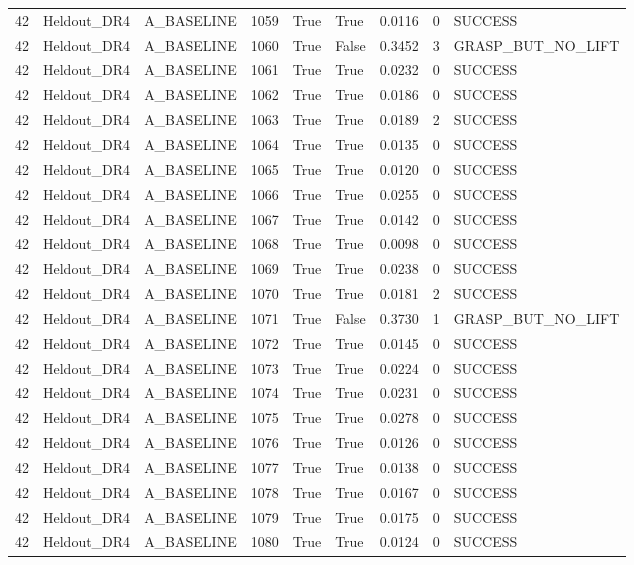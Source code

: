 \documentclass[11pt,a4paper,oneside]{book}
\begin{document}
\begin{longtable}{l l l l l l l l l}
42 & Heldout\_DR4 & A\_BASELINE & 1059 & True & True & 0.0116 & 0 & SUCCESS \\
42 & Heldout\_DR4 & A\_BASELINE & 1060 & True & False & 0.3452 & 3 & GRASP\_BUT\_NO\_LIFT \\
42 & Heldout\_DR4 & A\_BASELINE & 1061 & True & True & 0.0232 & 0 & SUCCESS \\
42 & Heldout\_DR4 & A\_BASELINE & 1062 & True & True & 0.0186 & 0 & SUCCESS \\
42 & Heldout\_DR4 & A\_BASELINE & 1063 & True & True & 0.0189 & 2 & SUCCESS \\
42 & Heldout\_DR4 & A\_BASELINE & 1064 & True & True & 0.0135 & 0 & SUCCESS \\
42 & Heldout\_DR4 & A\_BASELINE & 1065 & True & True & 0.0120 & 0 & SUCCESS \\
42 & Heldout\_DR4 & A\_BASELINE & 1066 & True & True & 0.0255 & 0 & SUCCESS \\
42 & Heldout\_DR4 & A\_BASELINE & 1067 & True & True & 0.0142 & 0 & SUCCESS \\
42 & Heldout\_DR4 & A\_BASELINE & 1068 & True & True & 0.0098 & 0 & SUCCESS \\
42 & Heldout\_DR4 & A\_BASELINE & 1069 & True & True & 0.0238 & 0 & SUCCESS \\
42 & Heldout\_DR4 & A\_BASELINE & 1070 & True & True & 0.0181 & 2 & SUCCESS \\
42 & Heldout\_DR4 & A\_BASELINE & 1071 & True & False & 0.3730 & 1 & GRASP\_BUT\_NO\_LIFT \\
42 & Heldout\_DR4 & A\_BASELINE & 1072 & True & True & 0.0145 & 0 & SUCCESS \\
42 & Heldout\_DR4 & A\_BASELINE & 1073 & True & True & 0.0224 & 0 & SUCCESS \\
42 & Heldout\_DR4 & A\_BASELINE & 1074 & True & True & 0.0231 & 0 & SUCCESS \\
42 & Heldout\_DR4 & A\_BASELINE & 1075 & True & True & 0.0278 & 0 & SUCCESS \\
42 & Heldout\_DR4 & A\_BASELINE & 1076 & True & True & 0.0126 & 0 & SUCCESS \\
42 & Heldout\_DR4 & A\_BASELINE & 1077 & True & True & 0.0138 & 0 & SUCCESS \\
42 & Heldout\_DR4 & A\_BASELINE & 1078 & True & True & 0.0167 & 0 & SUCCESS \\
42 & Heldout\_DR4 & A\_BASELINE & 1079 & True & True & 0.0175 & 0 & SUCCESS \\
42 & Heldout\_DR4 & A\_BASELINE & 1080 & True & True & 0.0124 & 0 & SUCCESS \\

\end{longtable}
\end{document}
